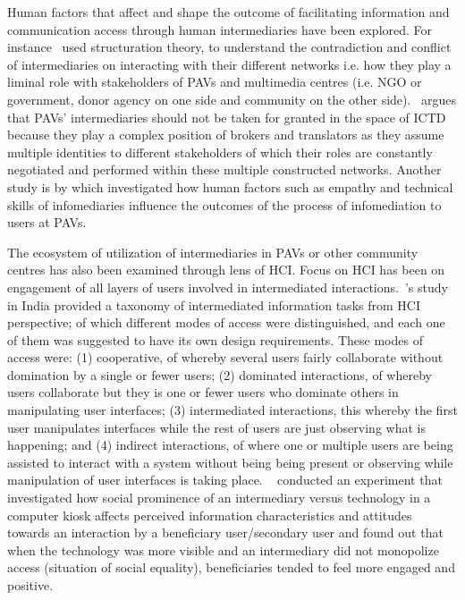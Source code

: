Human factors that affect and shape the outcome of facilitating information and communication access through human intermediaries have been explored. For instance~\cite{bailur2010liminal} used structuration theory\citep{jones2008giddens}, to understand the contradiction and conflict of intermediaries on interacting with their different networks i.e. how they play a liminal role with stakeholders of PAVs and multimedia centres (i.e. NGO or government, donor agency on one side and community on the other side).~\cite{bailur2012complex} argues that PAVs' intermediaries should not be taken for granted in the space of ICTD because they play a complex position of brokers and translators as they assume multiple identities to different stakeholders of which their roles are constantly negotiated and performed within these multiple constructed networks. Another study is by \cite{ramirez2013infomediaries} which investigated how human factors such as empathy and technical skills of infomediaries influence the outcomes of the process of infomediation to users at PAVs. 

The ecosystem of utilization of intermediaries in PAVs or other community centres has also been examined through lens of HCI. Focus on HCI has been on engagement of all layers of users involved in intermediated interactions.~\cite{parikh2006}'s study in India provided a taxonomy of intermediated information tasks from HCI perspective;  of which  different modes of access were distinguished, and each one of them was suggested to have its own design requirements. These modes of access were: (1) cooperative, of whereby several users fairly collaborate without domination by a single or fewer users; (2) dominated interactions, of whereby users collaborate but they is one or fewer users who dominate others in manipulating user interfaces; (3) intermediated interactions, this whereby the first user manipulates interfaces while the  rest of users are just observing what is happening; and (4) indirect interactions, of where one or multiple users are being assisted to interact with a system without being being present or observing while manipulation of user interfaces is taking place. ~\cite{sukumaran2009intermediated} conducted an experiment that investigated how social prominence of an intermediary versus technology in a computer kiosk affects perceived information characteristics and attitudes towards an interaction by a beneficiary user/secondary user and found out that when the technology was more visible and an intermediary did not monopolize access (situation of social equality), beneficiaries tended to feel more engaged and positive. 

